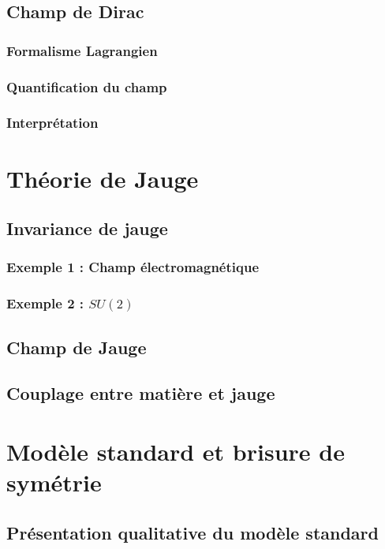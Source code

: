\documentclass{article}
\begin{document}
		\subsection{Champ de Dirac}
			\subsubsection{Formalisme Lagrangien}
			\subsubsection{Quantification du champ}
			\subsubsection{Interprétation}
		
		\section{Théorie de Jauge}
		
		\subsection{Invariance de jauge}
			\subsubsection{Exemple 1 : Champ électromagnétique}
			\subsubsection{Exemple 2 : $SU(2)$}
		\subsection{Champ de Jauge}
		
		\subsection{Couplage entre matière et jauge}
		

		
		
		\section{Modèle standard et brisure de symétrie}
		

		
		\subsection{Présentation qualitative du modèle standard}
		
\end{document}
